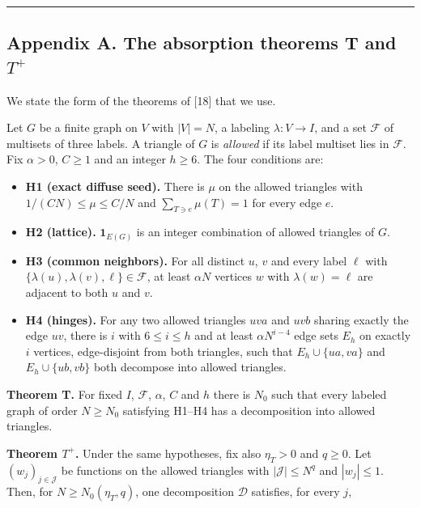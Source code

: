 \documentclass[english,11pt,a4paper]{article}
\providecommand{\tightlist}{\setlength{\itemsep}{0pt}\setlength{\parskip}{0pt}}
\begin{document}
\begin{center}\rule{0.5\linewidth}{0.5pt}\end{center}

\subsection{\texorpdfstring{Appendix A. The absorption theorems T and \(T^+\)}{Appendix A. The absorption theorems T and T\^{}+}}\label{appendix-a.-the-absorption-theorems-t-and-t}

We state the form of the theorems of {[}18{]} that we use.

Let \(G\) be a finite graph on \(V\) with \(|V|=N\), a labeling \(\lambda:V\to I\), and a set \(\mathcal F\) of multisets of three labels. A triangle of \(G\) is \emph{allowed} if its label multiset lies in \(\mathcal F\). Fix \(\alpha>0\), \(C\ge1\) and an integer \(h\ge6\). The four conditions are:

\begin{itemize}
\tightlist
\item
  \textbf{H1 (exact diffuse seed).} There is \(\mu\) on the allowed triangles with \(1/(CN)\le\mu\le C/N\) and \(\sum_{T\ni e}\mu(T)=1\) for every edge \(e\).
\item
  \textbf{H2 (lattice).} \(\mathbf 1_{E(G)}\) is an integer combination of allowed triangles of \(G\).
\item
  \textbf{H3 (common neighbors).} For all distinct \(u\), \(v\) and every label \(\ell\) with \(\{\lambda(u),\lambda(v),\ell\}\in\mathcal F\), at least \(\alpha N\) vertices \(w\) with \(\lambda(w)=\ell\) are adjacent to both \(u\) and \(v\).
\item
  \textbf{H4 (hinges).} For any two allowed triangles \(uva\) and \(uvb\) sharing exactly the edge \(uv\), there is \(i\) with \(6\le i\le h\) and at least \(\alpha N^{i-4}\) edge sets \(E_h\) on exactly \(i\) vertices, edge-disjoint from both triangles, such that \(E_h\cup\{ua,va\}\) and \(E_h\cup\{ub,vb\}\) both decompose into allowed triangles.
\end{itemize}

\textbf{Theorem T.} For fixed \(I\), \(\mathcal F\), \(\alpha\), \(C\) and \(h\) there is \(N_0\) such that every labeled graph of order \(N\ge N_0\) satisfying H1--H4 has a decomposition into allowed triangles.

\textbf{Theorem \(T^+\).} Under the same hypotheses, fix also \(\eta_T>0\) and \(q\ge0\). Let \((w_j)_{j\in\mathcal J}\) be functions on the allowed triangles with \(|\mathcal J|\le N^q\) and \(|w_j|\le1\). Then, for \(N\ge N_0(\eta_T,q)\), one decomposition \(\mathcal D\) satisfies, for every \(j\),
\end{document}
